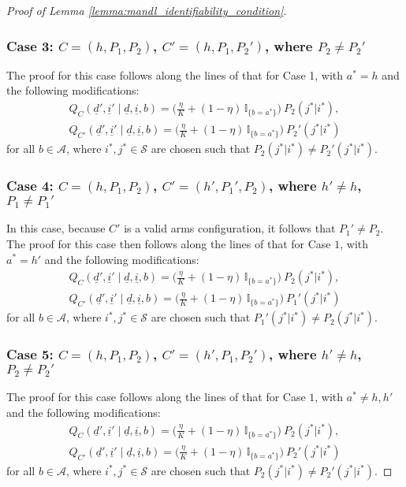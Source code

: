 \begin{proof}[Proof of Lemma \ref{lemma:mandl_identifiability_condition}]
\subsubsection{Case 3: $C=(h, P_1, P_2)$, $C'=(h, P_1, P_2')$, where $P_2\neq P_2'$}
The proof for this case follows along the lines of that for Case 1, with $a^*=h$ and the following modifications:
\begin{align}
	Q_C(\underline{d}', \underline{i}'\mid \underline{d}, \underline{i}, b)=\bigg(\frac{\eta}{K}+(1-\eta)\,\mathbb{I}_{\{b=a^*\}}\bigg)~P_2(j^*|i^*),\nonumber\\
	Q_{C'}(\underline{d}', \underline{i}'\mid \underline{d}, \underline{i}, b)=\bigg(\frac{\eta}{K}+(1-\eta)\,\mathbb{I}_{\{b=a^*\}}\bigg)~P_2'(j^*|i^*)
	\label{eq:proof_of_mandl_identifiability_3}
\end{align}
for all $b\in \mathcal{A}$, where $i^*, j^*\in \mathcal{S}$ are chosen such that $P_2(j^*|i^*) \neq P_2'(j^*|i^*)$.

\subsubsection{Case 4: $C=(h, P_1, P_2)$, $C'=(h', P_1', P_2)$, where $h'\neq h$, $P_1\neq P_1'$}
In this case, because $C'$ is a valid arms configuration, it follows that $P_1'\neq P_2$. The proof for this case then follows along the lines of that for Case $1$, with $a^*=h'$ and the following modifications:
\begin{align}
	Q_C(\underline{d}', \underline{i}'\mid \underline{d}, \underline{i}, b)=\bigg(\frac{\eta}{K}+(1-\eta)\,\mathbb{I}_{\{b=a^*\}}\bigg)~P_2(j^*|i^*),\nonumber\\
	Q_{C'}(\underline{d}', \underline{i}'\mid \underline{d}, \underline{i}, b)=\bigg(\frac{\eta}{K}+(1-\eta)\,\mathbb{I}_{\{b=a^*\}}\bigg)~P_1'(j^*|i^*)
	\label{eq:proof_of_mandl_identifiability_4}
\end{align}
for all $b\in \mathcal{A}$, where $i^*, j^*\in \mathcal{S}$ are chosen such that $P_1'(j^*|i^*) \neq P_2(j^*|i^*)$.

\subsubsection{Case 5: $C=(h, P_1, P_2)$, $C'=(h', P_1, P_2')$, where $h'\neq h$, $P_2\neq P_2'$}
The proof for this case follows along the lines of that for Case $1$, with $a^*\neq h,h'$ and the following modifications:
\begin{align}
	Q_C(\underline{d}', \underline{i}'\mid \underline{d}, \underline{i}, b)=\bigg(\frac{\eta}{K}+(1-\eta)\,\mathbb{I}_{\{b=a^*\}}\bigg)~P_2(j^*|i^*),\nonumber\\
	Q_{C'}(\underline{d}', \underline{i}'\mid \underline{d}, \underline{i}, b)=\bigg(\frac{\eta}{K}+(1-\eta)\,\mathbb{I}_{\{b=a^*\}}\bigg)~P_2'(j^*|i^*)
	\label{eq:proof_of_mandl_identifiability_5}
\end{align}
for all $b\in \mathcal{A}$, where $i^*, j^*\in \mathcal{S}$ are chosen such that $P_2(j^*|i^*) \neq P_2'(j^*|i^*)$.


\end{proof}
